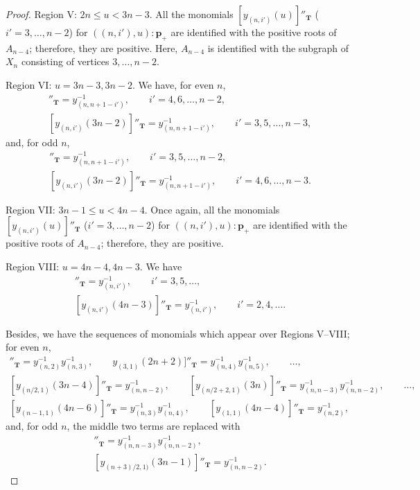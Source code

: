 \documentclass[pdftex]{sigma}
\numberwithin{equation}{section}
\theoremstyle{definition}
\begin{document}
\begin{proof}
Region V: $2n \leq u < 3n-3$.
All the  monomials
$[y_{(n,i')}(u)]''_{\mathbf{T}}$ ($i'=3,\dots,n-2$)
 for $((n,i'),u):\mathbf{p}_+$
are identif\/ied with
the positive roots of $A_{n-4}$;
therefore, they are positive.
Here, $A_{n-4}$ is identif\/ied with the subgraph of $X_n$
consisting of vertices $3, \dots, n-2$.

Region VI: $u=3n-3, 3n-2$.
We have, for even $n$,
\begin{gather*}
[y_{(n,i')}(3n-3)]''_{\mathbf{T}} =y_{(n,n+1-i')}^{-1},\qquad  i'=4,6,\dots,n-2,\nonumber\\
[y_{(n,i')}(3n-2)]''_{\mathbf{T}} =y_{(n,n+1-i')}^{-1},\qquad  i'=3,5,\dots,n-3,%
\end{gather*}
and, for odd $n$,
\begin{gather*}
[y_{(n,i')}(3n-3)]''_{\mathbf{T}} =y_{(n,n+1-i')}^{-1},\qquad i'=3,5,\dots,n-2,\nonumber\\
[y_{(n,i')}(3n-2)]''_{\mathbf{T}} =y_{(n,n+1-i')}^{-1},\qquad  i'=4,6,\dots,n-3.%
\end{gather*}

Region VII: $3n-1 \leq u < 4n-4$.
Once again, all the  monomials
$[y_{(n,i')}(u)]''_{\mathbf{T}}$ ($i'=3,\dots,n-2$)
 for $((n,i'),u):\mathbf{p}_+$
are identif\/ied with
the positive roots of $A_{n-4}$;
therefore, they are positive.



Region VIII: $u=4n-4, 4n-3$. We have
\begin{gather}
[y_{(n,i')}(4n-4)]''_{\mathbf{T}} =y_{(n,i')}^{-1}, \qquad i'=3,5,\dots,\nonumber\\
[y_{(n,i')}(4n-3)]''_{\mathbf{T}} =y_{(n,i')}^{-1}, \qquad i'=2,4,\dots.\label{eq:yt3r}
\end{gather}

Besides, we have the sequences of  monomials
which appear over Regions V--VIII;
for even $n$,
\begin{gather}
 [y_{(2,1)}(2n)]''_{\mathbf{T}}=y_{(n,2)}^{-1}y_{(n,3)}^{-1},
\qquad y_{(3,1)}(2n+2)]''_{\mathbf{T}}=y_{(n,4)}^{-1}y_{(n,5)}^{-1},\qquad
\dots,\nonumber\\
 [y_{(n/2,1)}(3n-4)]''_{\mathbf{T}}=y_{(n,n-2)}^{-1},\qquad
[y_{(n/2+2,1)}(3n)]''_{\mathbf{T}}=y_{(n,n-3)}^{-1}y_{(n,n-2)}^{-1},\qquad
\dots,\nonumber\\
 [y_{(n-1,1)}(4n-6)]''_{\mathbf{T}}=y_{(n,3)}^{-1}y_{(n,4)}^{-1},
\qquad [y_{(1,1)}(4n-4)]''_{\mathbf{T}}=y_{(n,2)}^{-1},\label{eq:yt2r}
\end{gather}
and, for odd $n$, the middle two terms are replaced with
\begin{gather}
[y_{((n-1)/2,1)}(3n-5)]''_{\mathbf{T}}=y_{(n,n-3)}^{-1}y_{(n,n-2)}^{-1},\nonumber\\
[y_{(n+3)/2,1)}(3n-1)]''_{\mathbf{T}}=y_{(n,n-2)}^{-1}.\label{eq:yt5r}
\end{gather}


\end{proof}
\end{document}
